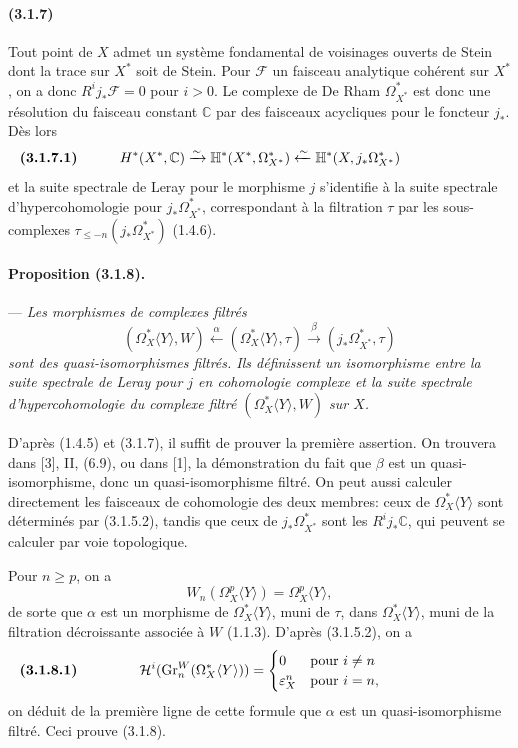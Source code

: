 \documentclass[10pt]{article}
\newcommand{\C}{\mathbb C}
\newcommand{\Gr}{\operatorname{Gr}}
\begin{document}
\paragraph{(3.1.7)} Tout point de $X$ admet un système fondamental de voisinages ouverts de Stein dont la trace sur $X^*$ soit de Stein. Pour $\mathcal F$ un faisceau analytique cohérent sur $X^*$, on a donc $R^ij_*\mathcal F=0$ pour $i>0$. Le complexe de De Rham $\Omega_{X^*}^*$ est donc une résolution du faisceau constant $\C$ par des faisceaux acycliques pour le foncteur $j_*$. Dès lors
\[
\makebox[\textwidth][s]{\textbf{(3.1.7.1)}\hfill$\displaystyle H^*(X^*,\C)\xrightarrow{\sim}\mathbb H^*(X^*,\Omega_{X^*}^*)\xleftarrow{\sim}\mathbb H^*(X,j_*\Omega_{X^*}^*)$\hfill\phantom{\textbf{(3.1.7.1)}}}
\]
et la suite spectrale de Leray pour le morphisme $j$ s'identifie à la suite spectrale d'hypercohomologie pour $j_*\Omega_{X^*}^*$, correspondant à la filtration $\tau$ par les sous-complexes $\tau_{\le -n}(j_*\Omega_{X^*}^*)$ (1.4.6).

\paragraph{Proposition (3.1.8).} --- {\itshape Les morphismes de complexes filtrés
\[
(\Omega_X^*\langle Y\rangle,W)
\xleftarrow{\ \alpha\ }
(\Omega_X^*\langle Y\rangle,\tau)
\xrightarrow{\ \beta\ }
(j_*\Omega_{X^*}^*,\tau)
\]
sont des quasi-isomorphismes filtrés. Ils définissent un isomorphisme entre la suite spectrale de Leray pour $j$ en cohomologie complexe et la suite spectrale d'hypercohomologie du complexe filtré $(\Omega_X^*\langle Y\rangle,W)$ sur $X$.}

D'après (1.4.5) et (3.1.7), il suffit de prouver la première assertion. On trouvera dans [3], II, (6.9), ou dans [1], la démonstration du fait que $\beta$ est un quasi-isomorphisme, donc un quasi-isomorphisme filtré. On peut aussi calculer directement les faisceaux de cohomologie des deux membres: ceux de $\Omega_X^*\langle Y\rangle$ sont déterminés par (3.1.5.2), tandis que ceux de $j_*\Omega_{X^*}^*$ sont les $R^ij_*\C$, qui peuvent se calculer par voie topologique.

Pour $n\ge p$, on a
\[
W_n(\Omega_X^p\langle Y\rangle)=\Omega_X^p\langle Y\rangle,
\]
de sorte que $\alpha$ est un morphisme de $\Omega_X^*\langle Y\rangle$, muni de $\tau$, dans $\Omega_X^*\langle Y\rangle$, muni de la filtration décroissante associée à $W$ (1.1.3). D'après (3.1.5.2), on a
\[
\makebox[\textwidth][s]{\textbf{(3.1.8.1)}\hfill$\displaystyle \mathcal H^i(\Gr_n^W(\Omega_X^*\langle Y\rangle))=\begin{cases}0&\text{pour }i\ne n\\ \varepsilon_X^n&\text{pour }i=n,\end{cases}$\hfill\phantom{\textbf{(3.1.8.1)}}}
\]
on déduit de la première ligne de cette formule que $\alpha$ est un quasi-isomorphisme filtré. Ceci prouve (3.1.8).
\end{document}
